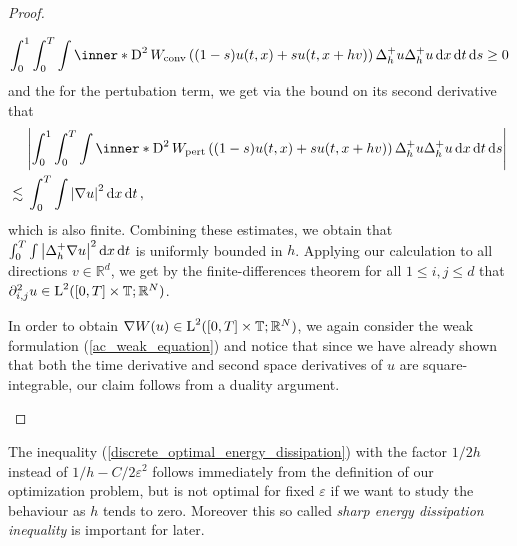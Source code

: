 \begin{proof}
\begin{description}[wide=0pt]
		\begin{equation*}
			\int_{ 0 }^{ 1 }
			\int_{ 0 }^{ T }
			\int
			\inner*{ 
				\diff^{ 2 } W_{ \mathrm{conv} } \left( ( 1- s ) u ( t, x  ) + s u( t,  x + h v ) \right) 
				\Delta_{ h }^{ + } u
			}{
				\Delta_{ h }^{ + } u 
			}
			\dd{ x }
			\dd{ t }
			\dd{ s }
			\geq 0 
		\end{equation*}
		and the for the pertubation term, we get via the bound on its second derivative that
		\begin{align*}
			& \abs{
				\int_{ 0 }^{ 1 }
				\int_{ 0 }^{ T }
				\int
				\inner*{ 
					\diff^{ 2 } W_{ \mathrm{pert} } \left( (1 - s ) u ( t, x  ) + s  u( t,  x + h v )  \right) 
					\Delta_{ h }^{ + } u
				}{
					\Delta_{ h }^{ + } u 
				}
				\dd{ x }
				\dd{ t }
				\dd{ s }
			}
			\\
			\lesssim {} &
			\int_{ 0 }^{ T }
			\int
			\abs{ \nabla u }^{ 2 }
			\dd{ x }
			\dd{ t },
		\end{align*}
		which is also finite. 
		Combining these estimates, we obtain that $ \int_{ 0 }^{ T } \int \abs{ \Delta_{ h }^{ + } \nabla u }^{ 2 } \dd{ x } \dd{ t } $ is uniformly bounded in $ h $. Applying our calculation to all directions $ v \in \mathbb{ R }^{ d } $, we get by the finite-differences theorem for all $ 1 \leq i, j \leq d $ that $ \partial_{ i , j }^{ 2 } u \in \operatorname{L}^{ 2 } ( [ 0 , T ] \times \operatorname{\mathbb{T}} ; \mathbb{ R }^{ N } ) $.
		
		In order to obtain $ \nabla W ( u ) \in \operatorname{L}^{ 2 } ( [ 0 , T ] \times \operatorname{\mathbb{T}} ; \mathbb{ R }^{ N } ) $, we again consider the weak formulation (\ref{ac_weak_equation}) and notice that since we have already shown that both the time derivative and second space derivatives of $ u $ are square-integrable, our claim follows from a duality argument. 
	\end{description}
\end{proof}

\begin{remark}
	The inequality (\ref{discrete_optimal_energy_dissipation}) with the factor $ 1/2h $ instead of $ 1/h- C/2\varepsilon^{ 2 } $ follows immediately from the definition of our optimization problem, but is not optimal for fixed $ \varepsilon $ if we want to study the behaviour as $ h $ tends to zero. Moreover this so called \emph{sharp energy dissipation inequality} is important for later.
\end{remark}

